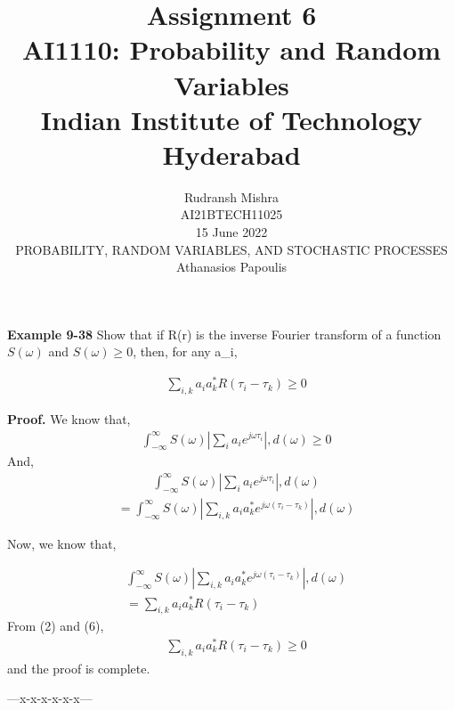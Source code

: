 \documentclass[journal,12pt,twocolumn]{IEEEtran}
\title{Assignment 6 \\ \Large AI1110: Probability and Random Variables \\ \large Indian Institute of Technology Hyderabad}
\author{Rudransh Mishra \\ \normalsize AI21BTECH11025 \\ \vspace*{20pt} \normalsize  15 June 2022 \\ \vspace*{20pt} PROBABILITY, RANDOM VARIABLES, AND STOCHASTIC PROCESSES\\ \normalsize Athanasios Papoulis}
\begin{document}
\maketitle

\textbf{Example 9-38}
Show that if R(r) is the inverse Fourier transform of a function $S(\omega)$ and $S(\omega) \geq 0$, then, for any a_i,
\par 
\begin{align}
  &\sum_{i,k}^{} a_i a_k^{*} R(\tau_i - \tau_k) \geq 0
\end{align}

\textbf{Proof.}
We know that,
\begin {align}
&\int_{-\infty}^{\infty}S(\omega) |\sum_{i}^{} a_i e^{j \omega \tau_i}|,d(\omega)\geq 0
\end {align}
And,
\begin {align}
&\int_{-\infty}^{\infty}S(\omega) | \sum_{i}^{} a_i e^{j \omega \tau_i}|,d(\omega) 
\end {align}
\begin {align}
&= \int_{-\infty}^{\infty}S(\omega) | \sum_{i,k}^{} a_i a_k^{*} e^{j \omega (\tau_i-\tau_k)}| ,d(\omega)
\end {align}

Now, we know that,

\begin {align}
&\int_{-\infty}^{\infty}S(\omega) | \sum_{i,k}^{} a_i a_k^{*} e^{j \omega (\tau_i-\tau_k)}| ,d(\omega)\\
&=\sum_{i,k}^{} a_i a_k^{*} R(\tau_i - \tau_k)
\end {align}
From (2) and (6),
\begin {align}
&\sum_{i,k}^{} a_i a_k^{*} R(\tau_i - \tau_k) \geq 0
\end {align}
and the proof is complete.

\begin{center} ---x-x-x-x-x-x--- \end{center}
\end{document}
